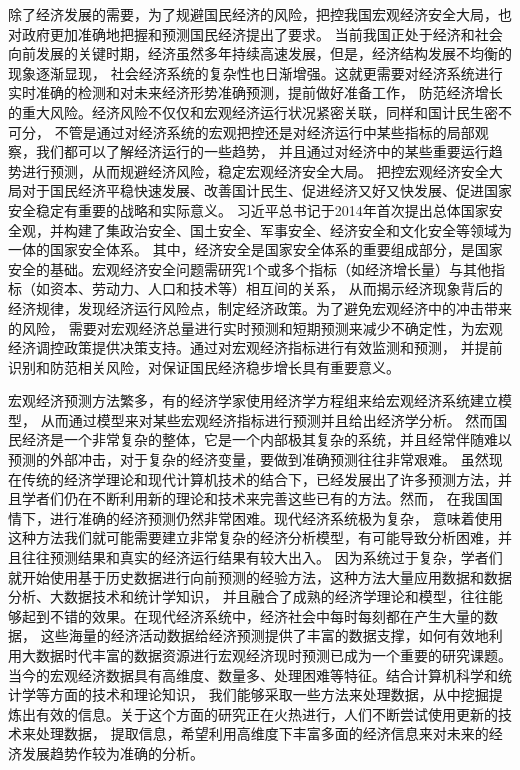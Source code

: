 除了经济发展的需要，为了规避国民经济的风险，把控我国宏观经济安全大局，也对政府更加准确地把握和预测国民经济提出了要求。
当前我国正处于经济和社会向前发展的关键时期，经济虽然多年持续高速发展，但是，经济结构发展不均衡的现象逐渐显现，
社会经济系统的复杂性也日渐增强。这就更需要对经济系统进行实时准确的检测和对未来经济形势准确预测，提前做好准备工作，
防范经济增长的重大风险。经济风险不仅仅和宏观经济运行状况紧密关联，同样和国计民生密不可分，
不管是通过对经济系统的宏观把控还是对经济运行中某些指标的局部观察，我们都可以了解经济运行的一些趋势，
并且通过对经济中的某些重要运行趋势进行预测，从而规避经济风险，稳定宏观经济安全大局。
把控宏观经济安全大局对于国民经济平稳快速发展、改善国计民生、促进经济又好又快发展、促进国家安全稳定有重要的战略和实际意义。
习近平总书记于2014年首次提出总体国家安全观，并构建了集政治安全、国土安全、军事安全、经济安全和文化安全等领域为一体的国家安全体系。
其中，经济安全是国家安全体系的重要组成部分，是国家安全的基础。宏观经济安全问题需研究1个或多个指标（如经济增长量）与其他指标（如资本、劳动力、人口和技术等）相互间的关系，
从而揭示经济现象背后的经济规律，发现经济运行风险点，制定经济政策。为了避免宏观经济中的冲击带来的风险，
需要对宏观经济总量进行实时预测和短期预测来减少不确定性，为宏观经济调控政策提供决策支持。通过对宏观经济指标进行有效监测和预测，
并提前识别和防范相关风险，对保证国民经济稳步增长具有重要意义。

宏观经济预测方法繁多，有的经济学家使用经济学方程组来给宏观经济系统建立模型，
从而通过模型来对某些宏观经济指标进行预测并且给出经济学分析。
然而国民经济是一个非常复杂的整体，它是一个内部极其复杂的系统，并且经常伴随难以预测的外部冲击，对于复杂的经济变量，要做到准确预测往往非常艰难。
虽然现在传统的经济学理论和现代计算机技术的结合下，已经发展出了许多预测方法，并且学者们仍在不断利用新的理论和技术来完善这些已有的方法。然而，
在我国国情下，进行准确的经济预测仍然非常困难。现代经济系统极为复杂，
意味着使用这种方法我们就可能需要建立非常复杂的经济分析模型，有可能导致分析困难，并且往往预测结果和真实的经济运行结果有较大出入。
因为系统过于复杂，学者们就开始使用基于历史数据进行向前预测的经验方法，这种方法大量应用数据和数据分析、大数据技术和统计学知识，
并且融合了成熟的经济学理论和模型，往往能够起到不错的效果。在现代经济系统中，经济社会中每时每刻都在产生大量的数据，
这些海量的经济活动数据给经济预测提供了丰富的数据支撑，如何有效地利用大数据时代丰富的数据资源进行宏观经济现时预测已成为一个重要的研究课题。
当今的宏观经济数据具有高维度、数量多、处理困难等特征。结合计算机科学和统计学等方面的技术和理论知识，
我们能够采取一些方法来处理数据，从中挖掘提炼出有效的信息。关于这个方面的研究正在火热进行，人们不断尝试使用更新的技术来处理数据，
提取信息，希望利用高维度下丰富多面的经济信息来对未来的经济发展趋势作较为准确的分析。

